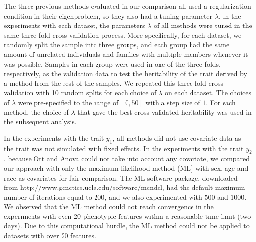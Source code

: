 \documentclass[10pt,letterpaper]{article}
\begin{document}
The three previous methods evaluated in our comparison all used a regularization condition in their eigenproblem, so they also had a tuning parameter $\lambda$. In the experiments with each dataset, the parameters $\lambda$ of all methods were tuned in the same three-fold cross validation process. 
More specifically, for each dataset, we randomly split the sample into three groups, and each group had the same amount of unrelated individuals and families with multiple members whenever it was possible. Samples in each group were used in one of the three folds, respectively, as the validation data to test the heritability of the trait derived by a method from the rest of the samples. We repeated this three-fold cross validation with 10 random splits for each choice of $\lambda$ on each dataset. The choices of $\lambda$ were pre-specified to the range of $[0,50]$ with a step size of $1$. For each method, the choice of $\lambda$ that gave the best cross validated heritability was used in the subsequent analysis.

In the experiments with the trait $y_1$, all methods did not use covariate data as the trait was not simulated with fixed effects. In the experiments with the trait $y_2$, because Ott \cite{Ott:1999:pch} and Anova \cite{pch:Oualkacha:2012} could not take into account any covariate, we compared our approach with only the maximum likelihood method (ML) \cite{mendal2013} with sex, age and race as covariates for fair comparison. The ML software package, downloaded from http://www.genetics.ucla.edu/software/mendel, had the default maximum number of iterations equal to $200$, and we also experimented with $500$ and $1000$.  We observed that the ML method could not reach convergence in the experiments with even 20 phenotypic features within a reasonable time limit (two days). Due to this computational hurdle, the ML method could not be applied to datasets with over 20 features.
\end{document}
